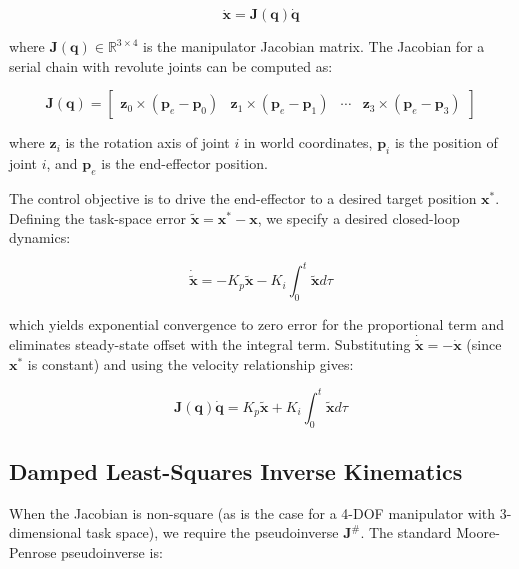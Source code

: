 \documentclass[12pt,a4paper,oneside]{report}
\begin{document}
\begin{equation}
\dot{\mathbf{x}} = \mathbf{J}(\mathbf{q}) \dot{\mathbf{q}}
\end{equation}

where $\mathbf{J}(\mathbf{q}) \in \mathbb{R}^{3 \times 4}$ is the manipulator Jacobian matrix. The Jacobian for a serial chain with revolute joints can be computed as:

\begin{equation}
\mathbf{J}(\mathbf{q}) = \begin{bmatrix}
\mathbf{z}_0 \times (\mathbf{p}_e - \mathbf{p}_0) & \mathbf{z}_1 \times (\mathbf{p}_e - \mathbf{p}_1) & \cdots & \mathbf{z}_3 \times (\mathbf{p}_e - \mathbf{p}_3)
\end{bmatrix}
\end{equation}

where $\mathbf{z}_i$ is the rotation axis of joint $i$ in world coordinates, $\mathbf{p}_i$ is the position of joint $i$, and $\mathbf{p}_e$ is the end-effector position.

The control objective is to drive the end-effector to a desired target position $\mathbf{x}^*$. Defining the task-space error $\tilde{\mathbf{x}} = \mathbf{x}^* - \mathbf{x}$, we specify a desired closed-loop dynamics:

\begin{equation}
\dot{\tilde{\mathbf{x}}} = -K_p \tilde{\mathbf{x}} - K_i \int_0^t \tilde{\mathbf{x}} d\tau
\end{equation}

which yields exponential convergence to zero error for the proportional term and eliminates steady-state offset with the integral term. Substituting $\dot{\tilde{\mathbf{x}}} = -\dot{\mathbf{x}}$ (since $\mathbf{x}^*$ is constant) and using the velocity relationship gives:

\begin{equation}
\mathbf{J}(\mathbf{q}) \dot{\mathbf{q}} = K_p \tilde{\mathbf{x}} + K_i \int_0^t \tilde{\mathbf{x}} d\tau
\end{equation}

\subsection{Damped Least-Squares Inverse Kinematics}

When the Jacobian is non-square (as is the case for a 4-DOF manipulator with 3-dimensional task space), we require the pseudoinverse $\mathbf{J}^{\#}$. The standard Moore-Penrose pseudoinverse is:
\end{document}
